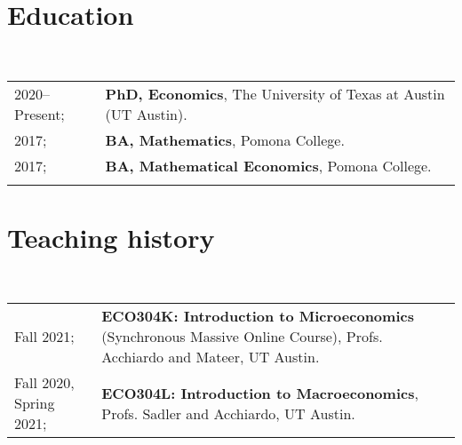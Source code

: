 \documentclass[a4paper, 11pt]{article}
\begin{document}
  \maketitle
  \thispagestyle{firststyle}
  \section{Education}
  ~\begin{tabular}{ll}
    2020--Present; & \textbf{PhD, Economics}, The University of Texas at Austin (UT Austin).\\
    2017; & \textbf{BA, Mathematics}, Pomona College.\\
    2017; & \textbf{BA, Mathematical Economics}, Pomona College.\\
    \vspace*{-0.50em}
  \end{tabular}

  \section{Teaching history}
  ~\begin{tabular}{l p{12cm}}
    Fall 2021; & \textbf{ECO304K: Introduction to Microeconomics} (Synchronous Massive Online Course), Profs. Acchiardo and Mateer, UT Austin.\\
    Fall 2020, Spring 2021; & \textbf{ECO304L: Introduction to Macroeconomics}, Profs. Sadler and Acchiardo, UT Austin.\\
  \end{tabular}
    
\end{document}
